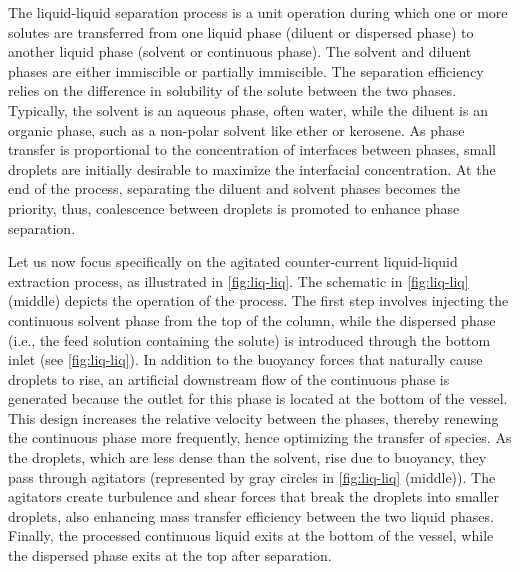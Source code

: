 The liquid-liquid separation process is a unit operation during which one or more solutes are transferred from one liquid phase (diluent or dispersed phase) to another liquid phase (solvent or continuous phase).
The solvent and diluent phases are either immiscible or partially immiscible.
The separation efficiency relies on the difference in solubility of the solute between the two phases.
Typically, the solvent is an aqueous phase, often water, while the diluent is an organic phase, such as a non-polar solvent like ether or kerosene.
As phase transfer is proportional to the concentration of interfaces between phases, small droplets are initially desirable to maximize the interfacial concentration.
At the end of the process, separating the diluent and solvent phases becomes the priority, thus, coalescence between droplets is promoted to enhance phase separation.

Let us now focus specifically on the agitated counter-current liquid-liquid extraction process, as illustrated in \ref{fig:liq-liq}. 
The schematic in \ref{fig:liq-liq} (middle) depicts the operation of the process.
The first step involves injecting the continuous solvent phase from the top of the column, while the dispersed phase (i.e., the feed solution containing the solute) is introduced through the bottom inlet (see \ref{fig:liq-liq}). 
In addition to the buoyancy forces that naturally cause droplets to rise, an artificial downstream flow of the continuous phase is generated because the outlet for this phase is located at the bottom of the vessel. 
This design increases the relative velocity between the phases, thereby renewing the continuous phase more frequently, hence optimizing the transfer of species.
As the droplets, which are less dense than the solvent, rise due to buoyancy, they pass through agitators (represented by gray circles in \ref{fig:liq-liq} (middle)). 
The agitators create turbulence and shear forces that break the droplets into smaller droplets, also enhancing mass transfer efficiency between the two liquid phases. 
Finally, the processed continuous liquid exits at the bottom of the vessel, while the dispersed phase exits at the top after separation. 

